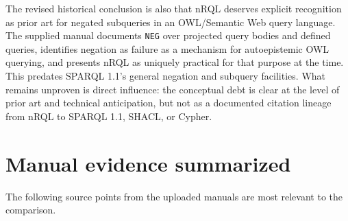 \documentclass[11pt,letterpaper]{article}
\newcommand{\nrql}{nRQL}
\newcommand{\shacl}{SHACL}
\newcommand{\naf}{negation as failure}
\begin{document}
The revised historical conclusion is also that \nrql{} deserves explicit recognition as prior art for negated subqueries in an OWL/Semantic Web query language. The supplied manual documents \texttt{NEG} over projected query bodies and defined queries, identifies \naf{} as a mechanism for autoepistemic OWL querying, and presents \nrql{} as uniquely practical for that purpose at the time. This predates SPARQL 1.1's general negation and subquery facilities. What remains unproven is direct influence: the conceptual debt is clear at the level of prior art and technical anticipation, but not as a documented citation lineage from \nrql{} to SPARQL 1.1, \shacl{}, or Cypher.

\appendix
\section{Manual evidence summarized}

The following source points from the uploaded manuals are most relevant to the comparison.
\end{document}
